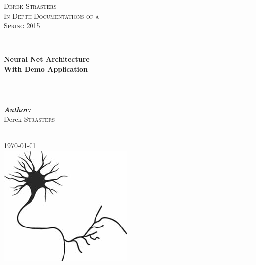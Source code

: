 \documentclass[a4paper,10pt]{article}
\let\oldemph\emph
\renewcommand{\emph}[1]{\textbf{\oldemph{#1}}}
\begin{document}

\begin{titlepage}

\newcommand{\HRule}{\rule{\linewidth}{0.5mm}} %

\center

\textsc{\LARGE Derek Strasters}\\[1.5cm]
\textsc{\Large In Depth Documentations of a}\\[0.5cm]
\textsc{\large Spring 2015}\\[0.5cm]

\HRule \\[0.4cm]
{ \huge \bfseries Neural Net Architecture}\\[0.4cm]
{ \huge \bfseries With Demo Application}\\[0.1cm]
\HRule \\[1.cm]

\begin{minipage}{\textwidth}
\begin{flushleft} \large
\emph{Author:}\\  
Derek \textsc{Strasters}
\end{flushleft}
\end{minipage}
\\[3cm]

{\large \today}\\[4.0cm]

\includegraphics[scale=00.55]{images/neuron.jpg}\\

\vfill

\end{titlepage} 

\end{document}
